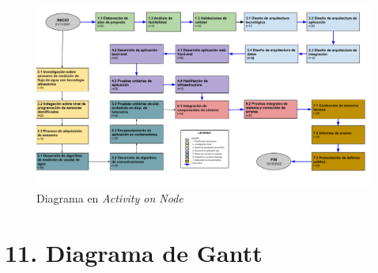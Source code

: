 \documentclass[
11pt, %
codirector, %
]{charter}
\begin{document}
\begin{landscape}

\begin{figure}[htpb]
\centering 
\includegraphics[scale=.6]{./Figuras/TF_MonAgua_AoN.png} 
\caption{Diagrama en \textit{Activity on Node}}
\label{fig:AoN}
\end{figure}
\end{landscape}


\section{11. Diagrama de Gantt}
\label{sec:gantt}
\end{document}
